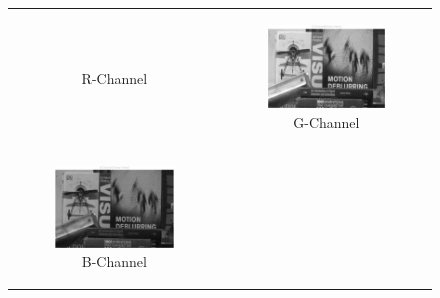 \documentclass[11pt, a4]{article}
\begin{document}
\begin{enumerate}
\begin{enumerate}
\begin{figure}[h]
{\begin{tabular}{cc}
\begin{subfigure}[h]{0.45\linewidth}
						\caption{R-Channel}
						\label{fig:problem1_R}
					\end{subfigure} &
					\begin{subfigure}[h]{0.45\linewidth}
						\centering
						\includegraphics[width=\linewidth]{../output/1_G-channel_linear.pdf}
						\caption{G-Channel}
						\label{fig:problem1_G_linear}
					\end{subfigure}\\
					\begin{subfigure}[h]{0.45\linewidth}
						\centering
						\includegraphics[width=\linewidth]{../output/1_B-channel_linear.pdf}
						\caption{B-Channel}
						\label{fig:problem1_B_linear}
					\end{subfigure} &
					\begin{subfigure}[h]{0.45\linewidth}
						\centering

\end{subfigure}
\end{tabular}}
\end{figure}
\end{enumerate}
\end{enumerate}
\end{document}
